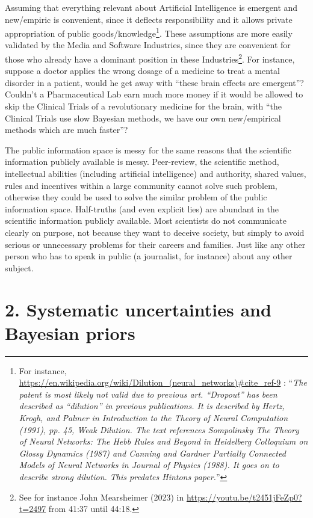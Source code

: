 \documentclass[11pt]{book}
\begin{document}
Assuming that everything relevant about Artificial Intelligence is
emergent and new/empiric is convenient, since it deflects
responsibility\cite{cais_statement_2023}
and it allows private appropriation of public
goods/knowledge\footnote{For instance,
  \url{https://en.wikipedia.org/wiki/Dilution_(neural_networks)\#cite_ref-9}
  : ``\emph{The patent is most likely not valid due to previous art.
  ``Dropout'' has been described as ``dilution'' in previous
  publications. It is described by Hertz, Krogh, and Palmer in
  Introduction to the Theory of Neural Computation (1991), pp. 45, Weak
  Dilution. The text references Sompolinsky The Theory of Neural
  Networks: The Hebb Rules and Beyond in Heidelberg Colloquium on Glossy
  Dynamics (1987) and Canning and Gardner Partially Connected Models of
  Neural Networks in Journal of Physics (1988). It goes on to describe
  strong dilution. This predates Hinton\textquotesingle s paper.}''}.
These assumptions are more easily validated by the Media and Software
Industries, since they are convenient for those who already have a
dominant position in these Industries\footnote{See for instance John
  Mearsheimer (2023) in \url{https://youtu.be/t2451jFeZp0?t=2497} from
  41:37 until 44:18.}. For instance, suppose a doctor applies the wrong
dosage of a medicine to treat a mental disorder in a patient, would he
get away with ``these brain effects are emergent''? Couldn't a
Pharmaceutical Lab earn much more money if it would be allowed to skip
the Clinical Trials of a revolutionary medicine for the brain, with
``the Clinical Trials use slow Bayesian methods, we have our own
new/empirical methods which are much faster''?

The public information space is messy for the same reasons that the
scientific information publicly available is messy. Peer-review, the
scientific method, intellectual abilities (including artificial
intelligence) and authority, shared values, rules and incentives within
a large community cannot solve such problem, otherwise they could be
used to solve the similar problem of the public information space.
Half-truths (and even explicit lies) are abundant in the scientific
information publicly available. Most scientists do not communicate
clearly on purpose, not because they want to deceive society, but simply
to avoid serious or unnecessary problems for their careers and families.
Just like any other person who has to speak in public (a journalist, for
instance) about any other subject.

\hypertarget{systematic-uncertainties-and-bayesian-priors}{%
\section{2. Systematic uncertainties and Bayesian
priors}\label{systematic-uncertainties-and-bayesian-priors}}
\end{document}
